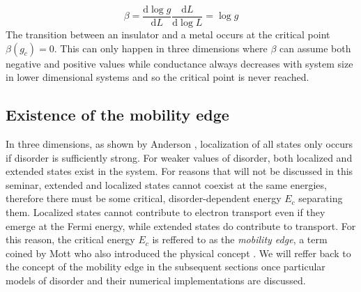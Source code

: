 \documentclass[10pt,a4paper]{article}
\begin{document}
$$
\beta=\frac{\mathrm{d}\log g}{\mathrm{d}L}\frac{\mathrm{d}L}{\mathrm{d}\log L}=\log g
$$
The transition between an insulator and a metal occurs at the critical point $\beta(g_c)=0$.  This can only happen in three dimensions where $\beta$ can assume both negative  
and positive values while conductance always decreases with system size in lower dimensional systems and so the critical point is never reached.
\subsection{Existence of the mobility edge}
\label{sec:mob}
\begin{minipage}[t]{0.5\textwidth} 
In three dimensions, as shown by Anderson \cite{Anderson}, localization of all states only occurs if disorder is sufficiently strong. For weaker values of disorder, both localized and extended states exist in the system. For reasons that will not be discussed in this seminar, extended and localized states cannot coexist at the same energies, therefore there must be some critical, disorder-dependent energy $E_c$ separating them. Localized states cannot contribute to electron transport even if they emerge at the Fermi energy, while extended states do contribute to transport. For this reason, the critical energy $E_c$ is reffered to as the \emph{mobility edge}, a term coined by Mott who also introduced the physical concept \cite{Mott_transitions}. 
We will reffer back to the concept of the mobility edge in the subsequent sections once particular models of disorder and their numerical implementations are discussed. 

\end{minipage}\hfill
\end{document}
